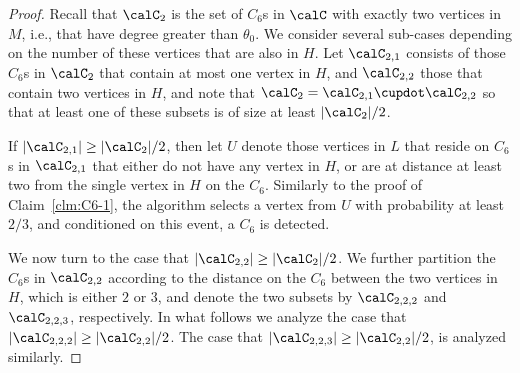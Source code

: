 \begin{proof}
Recall that $\calC_2$ is the set of $C_6$s in $\calC$ with exactly two vertices in $M$, i.e., that have degree greater than $\theta_0$. We consider several sub-cases depending on the number of  these vertices that are also in $H$. 
Let  $\calC_{2,1}$ consists of those $C_6$s in $\calC_2$ that contain at most one vertex in $H$, and $\calC_{2,2}$ those that contain two vertices in $H$, and note that $\calC_2=\calC_{2,1}\cupdot \calC_{2,2}$ so that at least one of these subsets is of size at least $|\calC_2|/2$. 

If $|\calC_{2,1}| \geq |\calC_2|/2$, then let $U$ denote those vertices in $L$ that reside on $C_6$s in $\calC_{2,1}$ that either do not have any vertex in $H$, or are at distance at least two from the single vertex in $H$ on the $C_6$. Similarly to the proof of Claim~\ref{clm:C6-1}, the algorithm selects a vertex from $U$ with probability at least $2/3$, and conditioned on this event, a $C_6$ is detected. 

We now turn to the case that $|\calC_{2,2}| \geq |\calC_2|/2$. We further partition the $C_6$s in $\calC_{2,2}$ according to the distance on the $C_6$ between the two vertices in $H$, which is either $2$ or $3$, and denote the two subsets by $\calC_{2,2,2}$ and $\calC_{2,2,3}$, respectively. In what follows we analyze the case that $|\calC_{2,2,2}| \geq |\calC_{2,2}|/2$.
The case that $|\calC_{2,2,3}| \geq |\calC_{2,2}|/2$, is analyzed similarly.




\end{proof}
